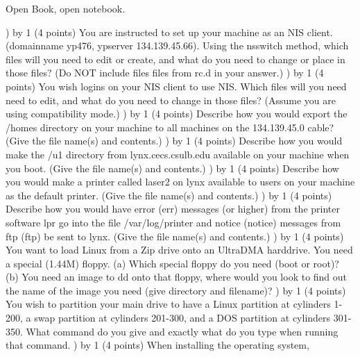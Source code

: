 
\parindent=0in
\nopagenumbers
\newcount\quesno
{}
\def\ques{\number\quesno) \advance\quesno by 1}
\def\aspace{\vskip 1.5in}

Open Book, open notebook.

\ques
(4 points)
You are instructed to set up your machine as an NIS client. (domainname yp476,
ypserver 134.139.45.66).  
Using the nsswitch method,
which files will you need to edit or create, and what do you need to change
or place in those files?
(Do NOT include files files from {\ltt{}rc.d} in your answer.)
\vskip 1.8in
\ques
(4 points)
You wish logins on your NIS client to use NIS.
Which files will you need need to edit, 
and what do you need to change in those files?
(Assume you are using compatibility mode.)
\vskip 1.0in
\ques
(4 points)
Describe how you would
export the {\ltt{}/homes} directory on your machine to all
machines on the 134.139.45.0 cable?
(Give the file name(s) and contents.)
\vskip 1.2in
\ques
(4 points)
Describe how you would make
the {\ltt{}/u1} directory from {\ltt{}lynx.cecs.csulb.edu}
available on your machine when you boot.
(Give the file name(s) and contents.)
\vskip 1.2in
\ques
(4 points)
Describe how you would make
a printer called {\ltt{}laser2} on {\ltt{}lynx} available to
users on your machine as the default printer.
(Give the file name(s) and contents.)
\vskip 1.0in
\vfill\eject
\ques
(4 points)
Describe how you would have
error ({\ltt{}err}) messages (or higher) from the printer software {\ltt{}lpr}
go into the file {\ltt{}/var/log/printer}
and
notice ({\ltt{}notice}) messages from ftp ({\ltt{}ftp})
be sent to {\ltt{}lynx}.
(Give the file name(s) and contents.)
\vskip 1.5in
\ques
(4 points)
You want to load Linux from a Zip drive onto an UltraDMA harddrive.
You need a special (1.44M) floppy.
(a) Which special floppy do you need (boot or root)?
(b) You need an image to {\ltt{}dd} onto that floppy, where would you
look to find out the name of the image you need (give directory
and filename)?
\vskip 1.0in
\ques
(4 points)
You wish to partition your main drive to have a Linux partition
at cylinders 1-200, a swap partition at cylinders 201-300,
and a DOS partition at cylinders 301-350.
What command do you give and exactly what do you type when
running that command.
\vskip 3.0in
\ques
(4 points)
When installing the operating system, 
